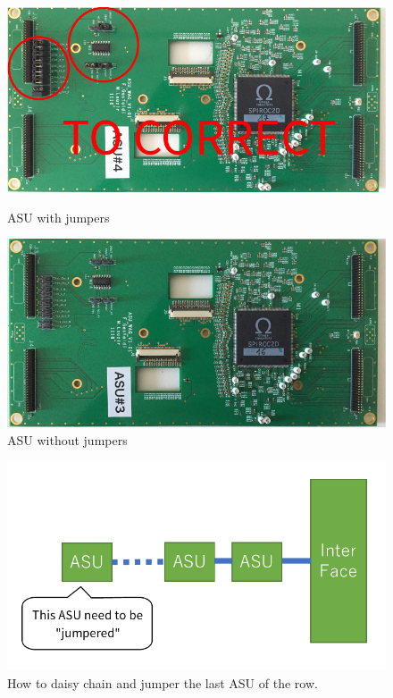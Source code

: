 \begin{figure}[ht]
  \centering
  \begin{minipage}{0.5\linewidth}
    \centering \includegraphics[width=0.98\linewidth,frame]{ASU-with-jumpers}
    \caption{ASU with jumpers}\label{fig:ASU-with-jumpers}
  \end{minipage}%
  \begin{minipage}{0.5\linewidth}
    \centering \includegraphics[width=0.98\linewidth,frame]{ASU-without-jumpers}
    \caption{ASU without jumpers}\label{fig:ASU-without-jumpers}
  \end{minipage}
\end{figure}
\begin{figure}[ht]
  \centering \includegraphics[width=0.5\linewidth, frame]{ASU-daisy-chain}
  \caption{How to daisy chain and jumper the last ASU of the row.}%
  \label{ASU-daisy-chain}
\end{figure}

